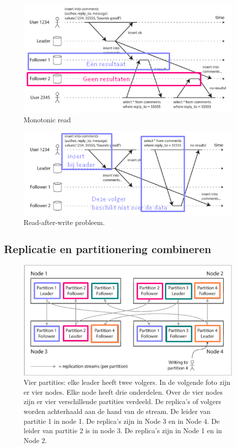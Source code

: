 \documentclass[a4paper,10pt,twoside]{report}
\begin{document}
\begin{figure}
	\includegraphics[width=\linewidth]{../images/Screenshot_213.png}
	\caption{Monotonic read}
\end{figure}

\begin{figure}
	\includegraphics[width=\linewidth]{../images/Screenshot_214.png}
	\caption{Read-after-write probleem.}
\end{figure}

\subsection{Replicatie en partitionering combineren}

\begin{figure}
	\includegraphics[width=\linewidth]{../images/Screenshot_215.png}
	\caption{Vier partities: elke leader heeft twee volgers. In de volgende foto zijn er vier nodes. Elke node heeft drie onderdelen. Over de vier nodes zijn er vier verschillende partities verdeeld. De replica's of volgers worden achterhaald aan de hand van de stream. De leider van partitie 1 in node 1. De replica's zijn in Node 3 en in Node 4. De leider van partitie 2 is in node 3. De replica's zijn in Node 1 en in Node 2.}
\end{figure}
\end{document}
